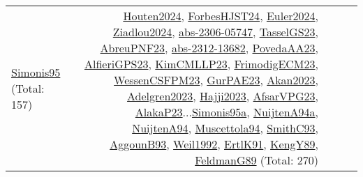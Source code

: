 {\begin{longtable}{p{3cm}r>{\raggedright\arraybackslash}p{6cm}>{\raggedright\arraybackslash}p{6cm}>{\raggedright\arraybackslash}p{8cm}}
\hyperref[detail:Simonis95]{Simonis95} (Total: 157) & \hyperref[detail:Houten2024]{Houten2024}, \hyperref[detail:ForbesHJST24]{ForbesHJST24}, \hyperref[detail:Euler2024]{Euler2024}, \hyperref[detail:Ziadlou2024]{Ziadlou2024}, \hyperref[detail:abs-2306-05747]{abs-2306-05747}, \hyperref[detail:TasselGS23]{TasselGS23}, \hyperref[detail:AbreuPNF23]{AbreuPNF23}, \hyperref[detail:abs-2312-13682]{abs-2312-13682}, \hyperref[detail:PovedaAA23]{PovedaAA23}, \hyperref[detail:AlfieriGPS23]{AlfieriGPS23}, \hyperref[detail:KimCMLLP23]{KimCMLLP23}, \hyperref[detail:FrimodigECM23]{FrimodigECM23}, \hyperref[detail:WessenCSFPM23]{WessenCSFPM23}, \hyperref[detail:GurPAE23]{GurPAE23}, \hyperref[detail:Akan2023]{Akan2023}, \hyperref[detail:Adelgren2023]{Adelgren2023}, \hyperref[detail:Hajji2023]{Hajji2023}, \hyperref[detail:AfsarVPG23]{AfsarVPG23}, \hyperref[detail:AlakaP23]{AlakaP23}...\hyperref[detail:Simonis95a]{Simonis95a}, \hyperref[detail:NuijtenA94a]{NuijtenA94a}, \hyperref[detail:NuijtenA94]{NuijtenA94}, \hyperref[detail:Muscettola94]{Muscettola94}, \hyperref[detail:SmithC93]{SmithC93}, \hyperref[detail:AggounB93]{AggounB93}, \hyperref[detail:Weil1992]{Weil1992}, \hyperref[detail:ErtlK91]{ErtlK91}, \hyperref[detail:KengY89]{KengY89}, \hyperref[detail:FeldmanG89]{FeldmanG89} (Total: 270)\\
\end{longtable}
}

\clearpage
